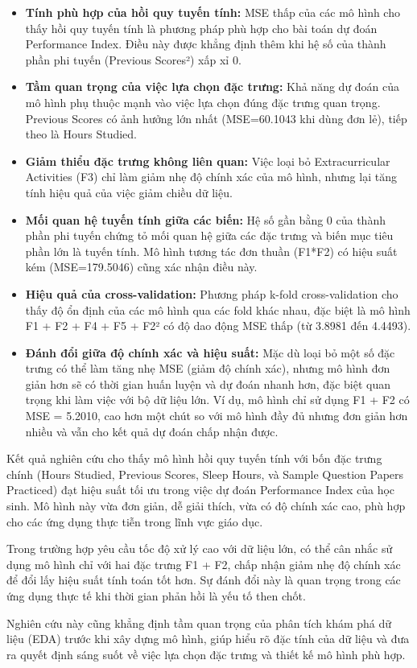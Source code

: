 \begin{itemize}
	\item \textbf{Tính phù hợp của hồi quy tuyến tính:} MSE thấp của các mô hình cho thấy hồi quy tuyến tính là phương pháp phù hợp cho bài toán dự đoán Performance Index. Điều này được khẳng định thêm khi hệ số của thành phần phi tuyến (Previous Scores²) xấp xỉ 0.

	\item \textbf{Tầm quan trọng của việc lựa chọn đặc trưng:} Khả năng dự đoán của mô hình phụ thuộc mạnh vào việc lựa chọn đúng đặc trưng quan trọng. Previous Scores có ảnh hưởng lớn nhất (MSE=60.1043 khi dùng đơn lẻ), tiếp theo là Hours Studied.

	\item \textbf{Giảm thiểu đặc trưng không liên quan:} Việc loại bỏ Extracurricular Activities (F3) chỉ làm giảm nhẹ độ chính xác của mô hình, nhưng lại tăng tính hiệu quả của việc giảm chiều dữ liệu.

	\item \textbf{Mối quan hệ tuyến tính giữa các biến:} Hệ số gần bằng 0 của thành phần phi tuyến chứng tỏ mối quan hệ giữa các đặc trưng và biến mục tiêu phần lớn là tuyến tính. Mô hình tương tác đơn thuần (F1*F2) có hiệu suất kém (MSE=179.5046) cũng xác nhận điều này.

	\item \textbf{Hiệu quả của cross-validation:} Phương pháp k-fold cross-validation cho thấy độ ổn định của các mô hình qua các fold khác nhau, đặc biệt là mô hình F1 + F2 + F4 + F5 + F2² có độ dao động MSE thấp (từ 3.8981 đến 4.4493).

	\item \textbf{Đánh đổi giữa độ chính xác và hiệu suất:} Mặc dù loại bỏ một số đặc trưng có thể làm tăng nhẹ MSE (giảm độ chính xác), nhưng mô hình đơn giản hơn sẽ có thời gian huấn luyện và dự đoán nhanh hơn, đặc biệt quan trọng khi làm việc với bộ dữ liệu lớn. Ví dụ, mô hình chỉ sử dụng F1 + F2 có MSE = 5.2010, cao hơn một chút so với mô hình đầy đủ nhưng đơn giản hơn nhiều và vẫn cho kết quả dự đoán chấp nhận được.
\end{itemize}

Kết quả nghiên cứu cho thấy mô hình hồi quy tuyến tính với bốn đặc trưng chính (Hours Studied, Previous Scores, Sleep Hours, và Sample Question Papers Practiced) đạt hiệu suất tối ưu trong việc dự đoán Performance Index của học sinh. Mô hình này vừa đơn giản, dễ giải thích, vừa có độ chính xác cao, phù hợp cho các ứng dụng thực tiễn trong lĩnh vực giáo dục.

Trong trường hợp yêu cầu tốc độ xử lý cao với dữ liệu lớn, có thể cân nhắc sử dụng mô hình chỉ với hai đặc trưng F1 + F2, chấp nhận giảm nhẹ độ chính xác để đổi lấy hiệu suất tính toán tốt hơn. Sự đánh đổi này là quan trọng trong các ứng dụng thực tế khi thời gian phản hồi là yếu tố then chốt.

Nghiên cứu này cũng khẳng định tầm quan trọng của phân tích khám phá dữ liệu (EDA) trước khi xây dựng mô hình, giúp hiểu rõ đặc tính của dữ liệu và đưa ra quyết định sáng suốt về việc lựa chọn đặc trưng và thiết kế mô hình phù hợp.